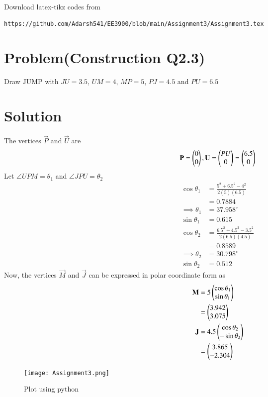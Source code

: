 \documentclass[journal,12pt,twocolumn]{IEEEtran}
\begin{document}
%
Download latex-tikz codes from 
%
\begin{lstlisting}
https://github.com/Adarsh541/EE3900/blob/main/Assignment3/Assignment3.tex
\end{lstlisting}
\section{Problem(Construction Q2.3)}
Draw JUMP with $JU = 3.5$, $UM = 4$, $MP = 5$, $PJ = 4.5$ and $PU = 6.5$
\section{Solution}
The vertices $\vec{P}$ and $\vec{U}$ are
\begin{align}
    \mathbf{P} = \begin{pmatrix}0\\0\end{pmatrix}, \mathbf{U} = \begin{pmatrix}PU\\0\end{pmatrix} = \begin{pmatrix}6.5\\0
    \end{pmatrix}
\end{align}
Let $\angle{UPM} = \theta_1$ and  $\angle{JPU} = \theta_2$
\begin{align}
    \cos{\theta_1} &= \frac{5^2+6.5^2-4^2}{2(5)(6.5)}\\
    &=0.7884\\
    \implies \theta_1 &= 37.958^{\circ}\\
    \sin{\theta_1} &= 0.615\\
    \cos{\theta_2} &= \frac{6.5^2+4.5^2-3.5^2}{2(6.5)(4.5)}\\
    &= 0.8589\\
    \implies \theta_2 &= 30.798^{\circ}\\
    \sin{\theta_2} &= 0.512
\end{align}
Now, the vertices $\vec{M}$ and $\vec{J}$ can be expressed in polar coordinate form as
\begin{align}
    \mathbf{M} &= 5\begin{pmatrix}\cos{\theta_1}\\\sin{\theta_1}\end{pmatrix}\\
    &= \begin{pmatrix}3.942\\3.075\end{pmatrix}\\
    \mathbf{J} &= 4.5\begin{pmatrix}\cos{\theta_2}\\-\sin{\theta_2}\end{pmatrix}\\
    &= \begin{pmatrix}3.865\\-2.304\end{pmatrix}
\end{align}


\begin{figure}[!h]
 \centering
 \texttt{[image: Assignment3.png]}
 \caption{Plot using python}
 \label{plot}
\end{figure}
\end{document}
